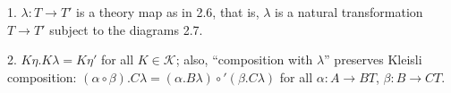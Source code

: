 1. $\lambda:T \longrightarrow T'$ is a theory map as in 2.6, that is, $\lambda$ is a natural transformation $T \longrightarrow T'$ subject to the diagrams 2.7.

2. $K\eta.K\lambda = K\eta'$ for all $K \in \mathcal{K}$; also, “composition with $\lambda$” preserves Kleisli composition: $(\alpha \circ \beta).C\lambda = (\alpha.B\lambda) \circ' (\beta.C\lambda)$ for all $\alpha:A \longrightarrow BT$, $\beta:B \longrightarrow CT$.